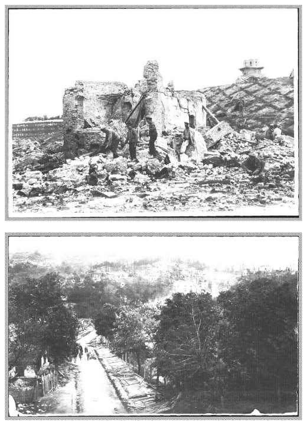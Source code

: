 \begin{center}
\includegraphics[width=\textwidth]{chast-vosp/zver/010.jpg}
\end{center}
\vspace*{\fill}

\newpage
\vspace*{\fill}

\begin{center}
\includegraphics[width=\textwidth]{chast-vosp/zver/011.jpg}
\end{center}

